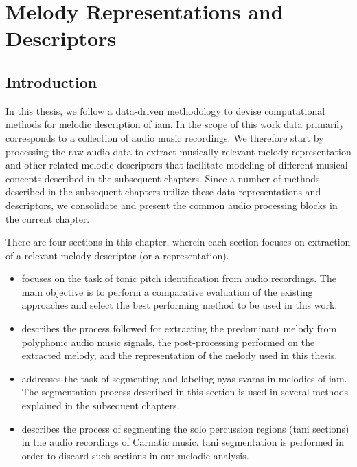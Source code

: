 
\chapter{Melody Representations and Descriptors}
\label{chap:data_preprocessing}

\section{Introduction}
\label{sec:data_preprocessing_intro}

In this thesis, we follow a data-driven methodology to devise computational methods for melodic description of \gls{iam}.  In the scope of this work data primarily corresponds to a collection of audio music recordings. We therefore start by processing the raw audio data to extract musically relevant melody representation and other related melodic descriptors that facilitate modeling of different musical concepts described in the subsequent chapters. Since a number of methods described in the subsequent chapters utilize these data representations and descriptors, we consolidate and present the common audio processing blocks in the current chapter.

There are four sections in this chapter, wherein each section focuses on extraction of a relevant melody descriptor (or a representation).
\begin{itemize}
	\item {} focuses on the task of tonic pitch identification from audio recordings. The main objective is to perform a comparative evaluation of the existing approaches and select the best performing method to be used in this work.
	\item {} describes the process followed for extracting the predominant melody from polyphonic audio music signals, the post-processing performed on the extracted melody, and the representation of the melody used in this thesis.
	\item {} addresses the task of segmenting and labeling \gls{nyas} \glspl{svara} in melodies of \gls{iam}. The segmentation process described in this section is used in several methods explained in the subsequent chapters. 
	\item {} describes the process of segmenting the solo percussion regions (\Gls{tani} sections) in the audio recordings of Carnatic music. \Gls{tani} segmentation is performed in order to discard such sections in our melodic analysis.  
\end{itemize}


